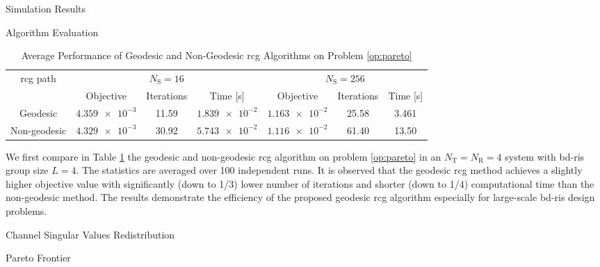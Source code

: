 \documentclass[journal]{IEEEtran}
\begin{document}
\begin{section}{Simulation Results}
 \begin{subsection}{Algorithm Evaluation}
	 \begin{table}[!t]
		 \caption{Average Performance of Geodesic and Non-Geodesic \gls{rcg} Algorithms on Problem \eqref{op:pareto}}
		 \label{tb:complexity}
		 \centering
		 \begin{tabular}{ccccccc}
			 \toprule
			 \multirow{2}{*}{\gls{rcg} path} & \multicolumn{3}{c}{$N_\mathrm{S}=16$} & \multicolumn{3}{c}{$N_\mathrm{S}=256$}                                                               \\ \cmidrule(lr){2-4} \cmidrule(lr){5-7}
			                                 & Objective                             & Iterations                             & Time [s]         & Objective        & Iterations & Time [s] \\ \midrule
			 Geodesic                        & $\num{4.359e-3}$                      & 11.59                                  & $\num{1.839e-2}$ & $\num{1.163e-2}$ & 25.58      & 3.461    \\
			 Non-geodesic                    & $\num{4.329e-3}$                      & 30.92                                  & $\num{5.743e-2}$ & $\num{1.116e-2}$ & 61.40      & 13.50    \\ \bottomrule
		 \end{tabular}
	 \end{table}
	 We first compare in Table \ref{tb:complexity} the geodesic and non-geodesic \gls{rcg} algorithm on problem \eqref{op:pareto} in an $N_\mathrm{T}=N_\mathrm{R}=4$ system with \gls{bd}-\gls{ris} group size $L=4$.
	 The statistics are averaged over \num{100} independent runs.
	 It is observed that the geodesic \gls{rcg} method achieves a slightly higher objective value with significantly (down to 1/3) lower number of iterations and shorter (down to 1/4) computational time than the non-geodesic method.
	 The results demonstrate the efficiency of the proposed geodesic \gls{rcg} algorithm especially for large-scale \gls{bd}-\gls{ris} design problems.
 \end{subsection}

 \begin{subsection}{Channel Singular Values Redistribution}
	 \begin{subsubsection}{Pareto Frontier}
		 \begin{figure}[!t]
			 \centering
\end{figure}
\end{subsubsection}
\end{subsection}
\end{section}
\end{document}
